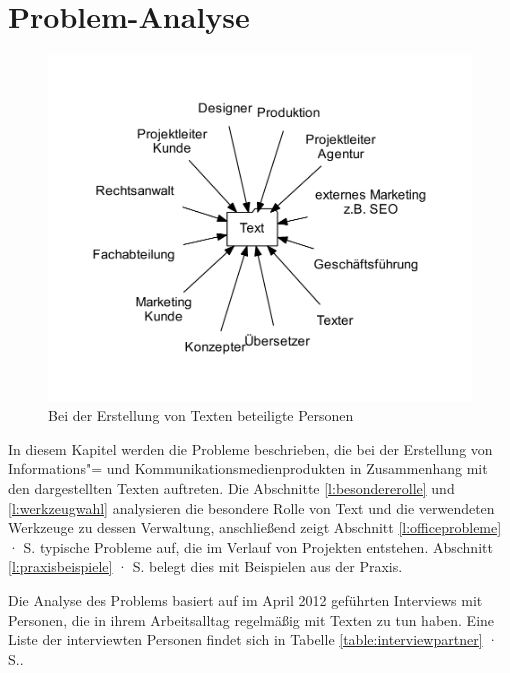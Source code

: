 \section{Problem-Analyse}\label{l:problemanalyse}

\begin{figure}[htb]
\begin{center}
\includegraphics[width=\textwidth]{media/chart-2.pdf}
\end{center}
\caption{Bei der Erstellung von Texten beteiligte Personen}
\label{chart:2}
\end{figure}

In diesem Kapitel werden die Probleme beschrieben, die bei der Erstellung von Informations"= und Kommunikationsmedienprodukten in Zusammenhang mit den dargestellten Texten auftreten. Die Abschnitte \ref{l:besondererolle} und \ref{l:werkzeugwahl} analysieren die besondere Rolle von Text und die verwendeten Werkzeuge zu dessen Verwaltung, anschließend zeigt Abschnitt \ref{l:officeprobleme} · S.\pageref{l:officeprobleme} typische Probleme auf, die im Verlauf von Projekten entstehen. Abschnitt \ref{l:praxisbeispiele} · S.\pageref{l:praxisbeispiele} belegt dies mit Beispielen aus der Praxis. 

\bigskip

Die Analyse des Problems basiert auf im April 2012 geführten Interviews mit Personen, die in ihrem Arbeitsalltag regelmäßig mit Texten zu tun haben. Eine Liste der interviewten Personen findet sich in Tabelle \ref{table:interviewpartner} · S.\pageref{table:interviewpartner}.

